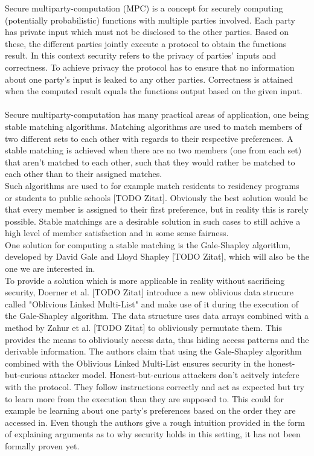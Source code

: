 Secure multiparty-computation (MPC) is a concept for securely computing (potentially probabilistic) functions with multiple parties involved. Each party has private input which must not be disclosed to the other parties. Based on these, the different parties jointly execute a protocol to obtain the functions result.
In this context security refers to the privacy of parties' inputs and correctness. To achieve privacy the protocol has to ensure that no information about one party's input is leaked to any other parties. Correctness is attained when the computed result equals the functions output based on the given input.\\
\ \\Secure multiparty-computation has many practical areas of application, one being stable matching algorithms. Matching algorithms are used to match members of two different sets to each other with regards to their respective preferences. A stable matching is achieved when there are no two members (one from each set) that aren't matched to each other, such that they would rather be matched to each other than to their assigned matches.\\ Such algorithms are used to for example match residents to residency programs or students to public schools [TODO Zitat]. Obviously the best solution would be that every member is assigned to their first preference, but in reality this is rarely possible. Stable matchings are a desirable solution in such cases to still achive a high level of member satisfaction and in some sense fairness.\\
One solution for computing a stable matching is the Gale-Shapley algorithm, developed by David Gale and Lloyd Shapley [TODO Zitat], which will also be the one we are interested in. \\
To provide a solution which is more applicable in reality without sacrificing security, Doerner et al. [TODO Zitat] introduce a new oblivious data strucure called "Oblivious Linked Multi-List" and make use of it during the execution of the Gale-Shapley algorithm. The data structure uses data arrays combined with a method by Zahur et al. [TODO Zitat] to obliviously permutate them. This provides the means to obliviously access data, thus hiding access patterns and the derivable information. The authors claim that using the Gale-Shapley algorithm combined with the Oblivious Linked Multi-List ensures security in the honest-but-curious attacker model. Honest-but-curious attackers don't acitvely intefere with the protocol. They follow instructions correctly and act as expected but try to learn more from the execution than they are supposed to. This could for example be learning about one party's preferences based on the order they are accessed in. Even though the authors give a rough intuition provided in the form of explaining arguments as to why security holds in this setting, it has not been formally proven yet.